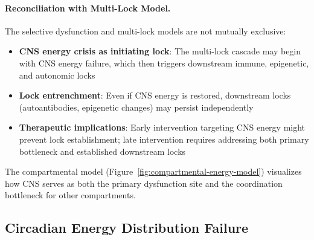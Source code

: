 \paragraph{Reconciliation with Multi-Lock Model.}

The selective dysfunction and multi-lock models are not mutually exclusive:

\begin{itemize}
    \item \textbf{CNS energy crisis as initiating lock}: The multi-lock cascade may begin with CNS energy failure, which then triggers downstream immune, epigenetic, and autonomic locks
    \item \textbf{Lock entrenchment}: Even if CNS energy is restored, downstream locks (autoantibodies, epigenetic changes) may persist independently
    \item \textbf{Therapeutic implications}: Early intervention targeting CNS energy might prevent lock establishment; late intervention requires addressing both primary bottleneck and established downstream locks
\end{itemize}

The compartmental model (Figure~\ref{fig:compartmental-energy-model}) visualizes how CNS serves as both the primary dysfunction site and the coordination bottleneck for other compartments.

\subsection{Circadian Energy Distribution Failure}
\label{subsec:circadian-energy-distribution}

